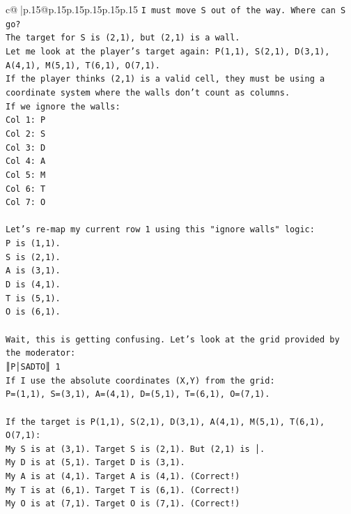 \documentclass{article}
\begin{document}
{\begin{supertabular}{c@{$\;$}|p{.15\linewidth}@{}p{.15\linewidth}p{.15\linewidth}p{.15\linewidth}p{.15\linewidth}p{.15\linewidth}}
{{{\texttt{I must move S out of the way. Where can S go?} \\
\texttt{The target for S is (2,1), but (2,1) is a wall.} \\
\texttt{Let me look at the player's target again: P(1,1), S(2,1), D(3,1), A(4,1), M(5,1), T(6,1), O(7,1).} \\
\texttt{If the player thinks (2,1) is a valid cell, they must be using a coordinate system where the walls don't count as columns.} \\
\texttt{If we ignore the walls:} \\
\texttt{Col 1: P} \\
\texttt{Col 2: S} \\
\texttt{Col 3: D} \\
\texttt{Col 4: A} \\
\texttt{Col 5: M} \\
\texttt{Col 6: T} \\
\texttt{Col 7: O} \\
\\ 
\texttt{Let's re{-}map my current row 1 using this "ignore walls" logic:} \\
\texttt{P is (1,1).} \\
\texttt{S is (2,1).} \\
\texttt{A is (3,1).} \\
\texttt{D is (4,1).} \\
\texttt{T is (5,1).} \\
\texttt{O is (6,1).} \\
\\ 
\texttt{Wait, this is getting confusing. Let's look at the grid provided by the moderator:} \\
\texttt{║P│SADTO║ 1} \\
\texttt{If I use the absolute coordinates (X,Y) from the grid:} \\
\texttt{P=(1,1), S=(3,1), A=(4,1), D=(5,1), T=(6,1), O=(7,1).} \\
\\ 
\texttt{If the target is P(1,1), S(2,1), D(3,1), A(4,1), M(5,1), T(6,1), O(7,1):} \\
\texttt{My S is at (3,1). Target S is (2,1). But (2,1) is │.} \\
\texttt{My D is at (5,1). Target D is (3,1).} \\
\texttt{My A is at (4,1). Target A is (4,1). (Correct!)} \\
\texttt{My T is at (6,1). Target T is (6,1). (Correct!)} \\
\texttt{My O is at (7,1). Target O is (7,1). (Correct!)} \\
}}}
\end{supertabular}}
\end{document}
